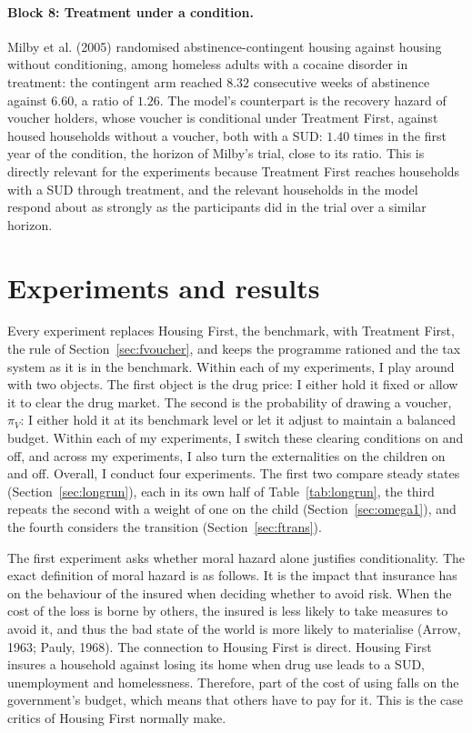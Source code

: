 \documentclass[10pt]{article}
\begin{document}
 \paragraph{Block 8:  Treatment under a condition.}
  Milby et al. (2005)  randomised abstinence-contingent housing against housing without conditioning, among homeless adults with a cocaine disorder in treatment: the contingent arm reached $8.32$ consecutive weeks of abstinence against $6.60$, a ratio of $1.26$. The model's counterpart is the recovery hazard of voucher holders, whose voucher is conditional under Treatment First, against housed households without a voucher, both with a SUD: $1.40$ times in the first year of the condition, the horizon of Milby's trial, close to its ratio.   This is directly relevant for the experiments because Treatment First reaches households with a SUD through treatment, and the relevant households in the model respond about as strongly as the participants did in the trial over a similar horizon.






\section{Experiments and results}\label{sec:experiments}

Every experiment replaces Housing First, the benchmark, with Treatment First, the rule of Section~\ref{sec:fvoucher}, and keeps the programme rationed and the tax system as it is in the benchmark.     Within each of my experiments, I play around with two objects. The first object is the drug price: I either hold it fixed or allow it to clear the drug market. The second is the probability of drawing a voucher, $\pi_V$: I either hold it at its benchmark level or let it adjust to maintain a balanced budget. Within each of my experiments, I switch these clearing conditions on and off, and across my experiments, I also turn the externalities on the children on and off.  Overall, I conduct  four experiments. The first two compare steady states (Section~\ref{sec:longrun}), each in its own half of Table~\ref{tab:longrun}, the third repeats the second with a weight of one on the child (Section~\ref{sec:omega1}), and the  fourth considers the transition (Section~\ref{sec:ftrans}).

The first experiment asks whether moral hazard alone justifies conditionality.   The exact definition of moral hazard is as follows. It is the impact that insurance has on the behaviour of the insured when deciding whether to avoid risk. When the cost of the loss is borne by others, the insured is less likely to take measures to avoid it, and thus the bad state of the world is more likely to materialise (Arrow, 1963; Pauly, 1968). The connection to Housing First is direct. Housing First insures a household against losing its home when drug use leads to a SUD, unemployment and homelessness. Therefore, part of the cost of using falls on the government's budget, which means that others have to pay for it. This is the case critics of Housing First normally make.
\end{document}

